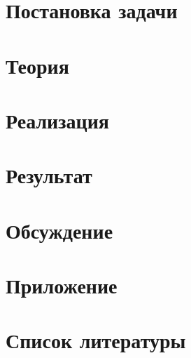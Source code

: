 \documentclass[a4paper,12pt]{article} %
\begin{document}
	
	\tableofcontents
	\newpage
	\listoffigures
	\newpage
	\listoftables
	\newpage
	\section{Постановка задачи}
	
	\newpage
	\section{Теория}
	
	\newpage
	\section{Реализация}
	
	\newpage
	\section{Результат}
	
	\newpage
	\section{Обсуждение}
	
	\newpage
	\section{Приложение}
	
	\newpage
	\section{Список литературы}
	
\end{document}

